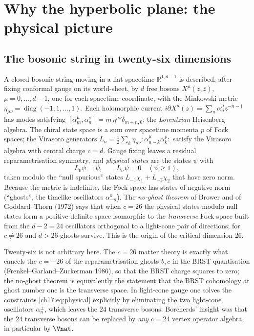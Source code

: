 \section{Why the hyperbolic plane: the physical picture}\label{ch17:sec:physics}

\subsection{The bosonic string in twenty-six dimensions}

A closed bosonic string moving in a flat spacetime $\mathbb R^{1,d-1}$ is described, after fixing
conformal gauge on its world-sheet, by $d$ free bosons $X^\mu(z,\bar z)$, $\mu=0,\dots,d-1$, one for each
spacetime coordinate, with the Minkowski metric $\eta_{\mu\nu}=\operatorname{diag}(-1,1,\dots,1)$.  Each
holomorphic current $i\partial X^\mu(z)=\sum_n\alpha^\mu_nz^{-n-1}$ has modes satisfying
$[\alpha^\mu_m,\alpha^\nu_n]=m\,\eta^{\mu\nu}\delta_{m+n,0}$: the \emph{Lorentzian} Heisenberg algebra.  The
chiral state space is a sum over spacetime momenta $p$ of Fock spaces; the Virasoro generators
$L_n=\frac12\sum_k\eta_{\mu\nu}{:}\alpha^\mu_{n-k}\alpha^\nu_k{:}$ satisfy the Virasoro algebra with central
charge $c=d$.  Gauge fixing leaves a residual reparametrisation symmetry, and \emph{physical states} are
the states $\psi$ with
\begin{equation}\label{ch17:eq:physical}
  L_0\psi=\psi,\qquad L_n\psi=0\quad(n\ge1),
\end{equation}
taken modulo the ``null spurious'' states $L_{-1}\chi_1+L_{-2}\chi_2$ that have zero norm.  Because the
metric is indefinite, the Fock space has states of negative norm (``ghosts'', the timelike oscillators
$\alpha^0_{-n}$).  The \emph{no-ghost theorem} of Brower and of Goddard--Thorn (1972) says that when
$c=26$ the physical states modulo null states form a positive-definite space isomorphic to the
\emph{transverse} Fock space built from the $d-2=24$ oscillators orthogonal to a light-cone pair of
directions; for $c\ne26$ and $d>26$ ghosts survive.  This is the origin of the critical dimension $26$.

\begin{physics}
Twenty-six is not arbitrary here.  The $c=26$ matter theory is exactly what cancels the $c=-26$ of the
reparametrisation ghosts $b,c$ in the BRST quantisation (Frenkel--Garland--Zuckerman 1986), so that the
BRST charge squares to zero; the no-ghost theorem is equivalently the statement that the BRST cohomology
at ghost number one is the transverse space.  In light-cone gauge one solves the constraints
\eqref{ch17:eq:physical} explicitly by eliminating the two light-cone oscillators $\alpha^\pm_n$, which
leaves the $24$ transverse bosons.  Borcherds' insight was that the $24$ transverse bosons can be replaced
by \emph{any} $c=24$ vertex operator algebra, in particular by $\Vnat$.
\end{physics}

